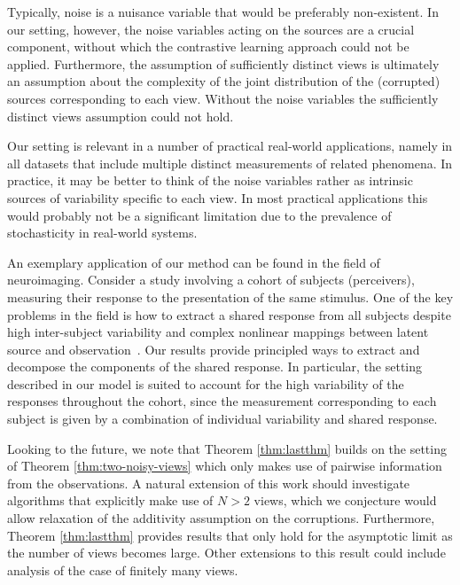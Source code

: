 Typically, noise is a nuisance variable that would be preferably non-existent.
In our setting, however, the noise variables acting on the sources are a crucial component, without which the contrastive learning approach could not be applied.
Furthermore, the assumption of sufficiently distinct views is ultimately an assumption about the complexity of the joint distribution of the (corrupted) sources corresponding to each view.
Without the noise variables the sufficiently distinct views assumption could not hold.


Our setting is relevant in a number of practical real-world applications, namely in all datasets that include multiple distinct measurements of related phenomena.
In practice, it may be better to think of the noise variables rather as intrinsic sources of variability specific to each view.
In most practical applications this would probably not be a significant limitation due to the prevalence of stochasticity in real-world systems.

An exemplary application of our method can be found in the field of neuroimaging.
Consider a study involving a cohort of subjects (perceivers), measuring their response to the presentation of the same stimulus.
One of the key problems in the field is how to extract a shared response from all subjects despite high inter-subject variability and complex nonlinear mappings between latent source and observation~\cite{chen2015reduced, haxby2011common}.
Our results provide principled ways to extract and decompose the components of the shared response.
In particular, the setting described in our model is suited to account for the high variability of the responses throughout the cohort, since the measurement corresponding to each subject is given by a combination of individual variability and shared response.

Looking to the future, we note that Theorem \ref{thm:lastthm} builds on the setting of Theorem \ref{thm:two-noisy-views} which only makes use of pairwise information from the observations.
A natural extension of this work should investigate algorithms that explicitly make use of $N>2$ views, which we conjecture would allow relaxation of the additivity assumption on the corruptions.
Furthermore, Theorem \ref{thm:lastthm} provides results that only hold for the asymptotic limit as the number of views becomes large.
Other extensions to this result could include analysis of the case of finitely many views.





